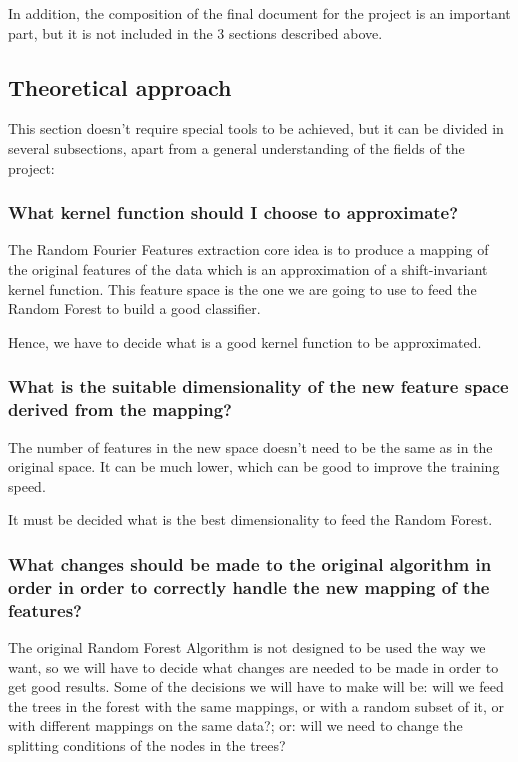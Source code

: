 \documentclass[a4paper]{article}
\begin{document}
    In addition, the composition of the final document for the project is an important part, but it is not included in the 3 sections described above.

        \subsection{Theoretical approach}

        This section doesn't require special tools to be achieved, but it can be divided in several subsections, apart from a general understanding of the fields of the project:

        \subsubsection{What kernel function should I choose to approximate?}

        The Random Fourier Features extraction core idea is to produce a mapping of the original features of the data which is an approximation of a shift-invariant kernel function. This feature space is the one we are going to use to feed the Random Forest to build a good classifier.

        Hence, we have to decide what is a good kernel function to be approximated.

        \subsubsection{What is the suitable dimensionality of the new feature space derived from the mapping?}

        The number of features in the new space doesn't need to be the same as in the original space. It can be much lower, which can be good to improve the training speed.

        It must be decided what is the best dimensionality to feed the Random Forest.

        \subsubsection{What changes should be made to the original algorithm in order in order to correctly handle the new mapping of the features?}

        The original Random Forest Algorithm is not designed to be used the way we want, so we will have to decide what changes are needed to be made in order to get good results. Some of the decisions we will have to make will be: will we feed the trees in the forest with the same mappings, or with a random subset of it, or with different mappings on the same data?; or: will we need to change the splitting conditions of the nodes in the trees?
\end{document}
